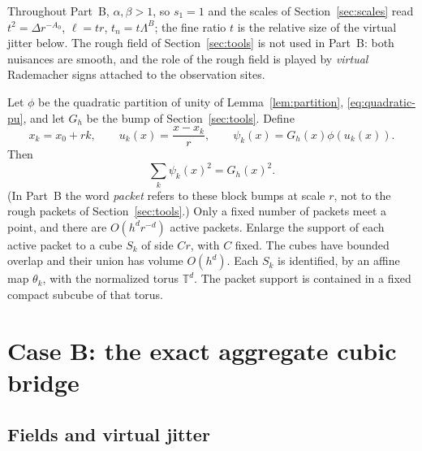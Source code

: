 \documentclass[11pt]{article}
\newcommand{\Torus}{\mathbb{T}}
\begin{document}
Throughout Part~B, \(\alpha,\beta>1\), so \(s_1=1\) and the scales of
Section~\ref{sec:scales} read \(t^2=\Delta r^{-A_0}\), \(\ell=tr\),
\(t_n=t\Lambda^B\); the fine ratio \(t\) is the relative size of the
virtual jitter below.
The rough field of Section~\ref{sec:tools} is not used in Part~B: both
nuisances are smooth, and the role of the rough field is played by
\emph{virtual} Rademacher signs attached to the observation sites.

Let \(\phi\) be the quadratic partition of unity of
Lemma~\ref{lem:partition}, \eqref{eq:quadratic-pu}, and let \(G_h\) be the
bump of Section~\ref{sec:tools}.  Define
\[
 x_k=x_0+rk,\qquad
 u_k(x)=\frac{x-x_k}{r},\qquad
 \psi_k(x)=G_h(x)\phi(u_k(x)).
\]
Then
\begin{equation}
 \sum_k\psi_k(x)^2=G_h(x)^2.
 \label{B:eq:quadratic-partition}
\end{equation}
(In Part~B the word \emph{packet} refers to these block bumps at scale
\(r\), not to the rough packets of Section~\ref{sec:tools}.)  Only a fixed
number of packets meet a point, and there are \(O(h^dr^{-d})\) active
packets.  Enlarge the support of each active packet
to a cube \(S_k\) of side \(C r\), with \(C\) fixed.  The cubes have bounded
overlap and their union has volume \(O(h^d)\).  Each \(S_k\) is identified,
by an affine map \(\theta_k\), with the normalized torus \(\Torus^d\).
The packet support is contained in a fixed compact subcube of that torus.

\section{Case B: the exact aggregate cubic bridge}

\subsection{Fields and virtual jitter}
\end{document}
